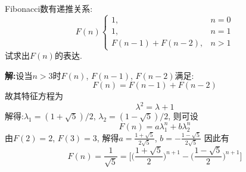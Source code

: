 \begin{problem}[习题1.8]
Fibonacci数有递推关系:
\begin{displaymath}
F(n)\left\{ \begin{array}{ll}
1, & n = 0 \\
1, & n = 1 \\
F(n-1) + F(n-2), & n>1
\end{array} \right.
\end{displaymath}
试求出$F(n)$的表达.
\end{problem}
\begin{solution}
\textbf{解:}设当$n>3$时$F(n)$, $F(n-1)$, $F(n-2)$满足:
\[
F(n)=F(n-1) + F(n-2)
\]
故其特征方程为
\[
\lambda ^2 = \lambda + 1
\]
解得:$\lambda_1 = (1+\sqrt{5})/2$, $\lambda_2=(1-\sqrt{5})/2$, 则可设
\[
F(n) = a \lambda_1^n + b\lambda_2^n
\]
由$F(2)=2$, $F(3)=3$, 解得$a=\frac{1+\sqrt{5}}{2\sqrt{5}}$, $b = -\frac{1-\sqrt{5}}{2\sqrt{5}}$
因此有
\[
F(n) = \frac{1}{\sqrt{5}} = \Big[\big(\frac{1+\sqrt{5}}{2}\big)^{n+1}- \big(\frac{1-\sqrt{5}}{2}\big)^{n+1}\Big]
\]


\end{solution}
